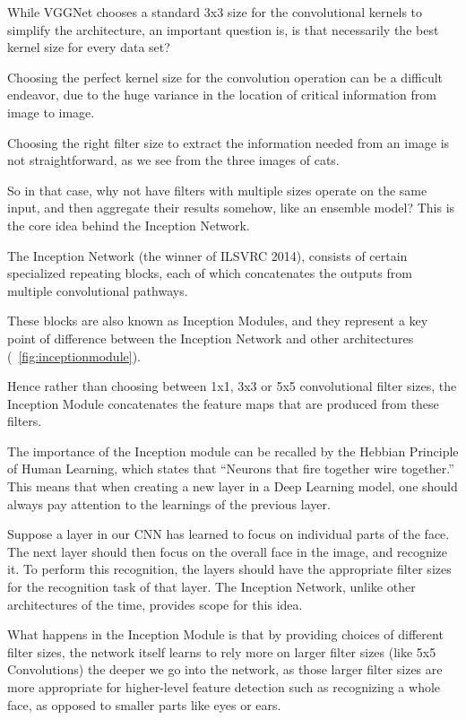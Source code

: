 	\begin{bulletedlist}
		\item While VGGNet chooses a standard 3x3 size for the convolutional kernels to simplify the architecture, an important question is, is that necessarily the best kernel size for every data set?
		\item Choosing the perfect kernel size for the convolution operation can be a difficult endeavor, due to the huge variance in the location of critical information from image to image.
		\item Choosing the right filter size to extract the information needed from an image is not straightforward, as we see from the three images of cats.
		\item So in that case, why not have filters with multiple sizes operate on the same input, and then aggregate their results somehow, like an ensemble model?  This is the core idea behind the Inception Network.
		\item The Inception Network (the winner of ILSVRC 2014), consists of certain specialized repeating blocks, each of which concatenates the outputs from multiple convolutional pathways.
		\item These blocks are also known as Inception Modules, and they represent a key point of difference between the Inception Network and other architectures (\figurename~\ref{fig:inceptionmodule}).
		\item Hence rather than choosing between 1x1, 3x3 or 5x5 convolutional filter sizes, the Inception Module concatenates the feature maps that are produced from these filters.
		\item The importance of the Inception module can be recalled by the Hebbian Principle of Human Learning, which states that ``Neurons that fire together wire together.'' This means that when creating a new layer in a Deep Learning model, one should always pay attention to the learnings of the previous layer.
		\item Suppose a layer in our CNN has learned to focus on individual parts of the face. The next layer should then focus on the overall face in the image, and recognize it. To perform this recognition, the layers should have the appropriate filter sizes for the recognition task of that layer.  The Inception Network, unlike other architectures of the time, provides scope for this idea.
		\item What happens in the Inception Module is that by providing choices of different filter sizes, the
network itself learns to rely more on larger filter sizes (like 5x5 Convolutions) the deeper we go into the network, as those larger filter sizes are more appropriate for higher-level feature detection such as recognizing a whole face, as opposed to smaller parts like eyes or ears.

\end{bulletedlist}
